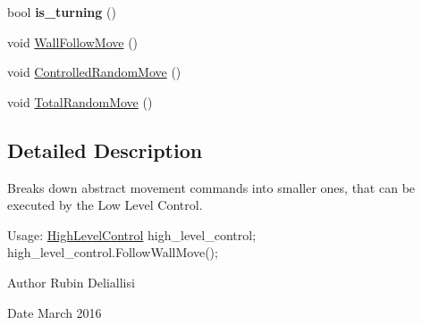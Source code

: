 \begin{DoxyCompactItemize}
\item 
\hypertarget{classHighLevelControl_a72337bf999829a3fc0752bdfe419f97d}{bool {\bfseries is\-\_\-turning} ()}\label{classHighLevelControl_a72337bf999829a3fc0752bdfe419f97d}

\item 
void \hyperlink{classHighLevelControl_ab1d5093f7707ff78368af39f5db38575}{Wall\-Follow\-Move} ()
\item 
void \hyperlink{classHighLevelControl_aa2ecdf510640a8bd7cb76ecd4a28a814}{Controlled\-Random\-Move} ()
\item 
void \hyperlink{classHighLevelControl_a58b9c0a66518e0fcd5461fe2eba25d9a}{Total\-Random\-Move} ()
\end{DoxyCompactItemize}


\subsection{Detailed Description}
Breaks down abstract movement commands into smaller ones, that can be executed by the Low Level Control. 

Usage\-: \hyperlink{classHighLevelControl}{High\-Level\-Control} high\-\_\-level\-\_\-control; high\-\_\-level\-\_\-control.\-Follow\-Wall\-Move();

\begin{DoxyAuthor}{Author}
Rubin Deliallisi 
\end{DoxyAuthor}
\begin{DoxyDate}{Date}
March 2016 
\end{DoxyDate}


